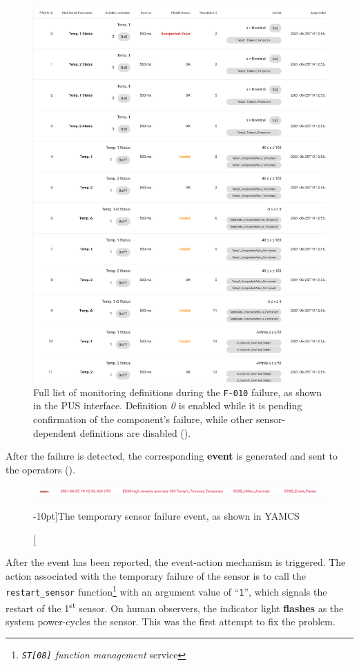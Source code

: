 \documentclass[a4paper,nobib]{tufte-book}
\begin{document}
\begin{figure}
\centering
\caption[Full list of monitoring definitions during the \texttt{F-010} failure]{Full list of monitoring definitions during the \texttt{F-010} failure, as shown in the \acs{PUS} interface. Definition \emph{0} is enabled while it is pending confirmation of the component's failure, while other sensor-dependent definitions are disabled (\invalid).}
\label{fig:pusf010moni}
\includegraphics[width=.8\textwidth]{media/screenshots/pus_f010_moni}
\end{figure}

After the failure is detected, the corresponding \textbf{event} is generated and sent to the operators ().
		
\begin{figure}
\centering
\includegraphics{media/screenshots/yamcs_f010_event}
\caption[][-10pt]{The temporary sensor failure event, as shown in \acs{YAMCS}}
\label{fig:yamcsf010event}
\end{figure}

After the event has been reported, the event-action mechanism is triggered. The action associated with the temporary failure of the sensor is to call the \texttt{restart\_sensor} function\footnote{\emph{\texttt{ST[08]} function management} service} with an argument value of ``\texttt{1}'', which signals the restart of the 1\textsuperscript{st} sensor. On human observers, the indicator light \textbf{flashes} as the system power-cycles the sensor. This was the first attempt to fix the problem.
	
\end{document}
